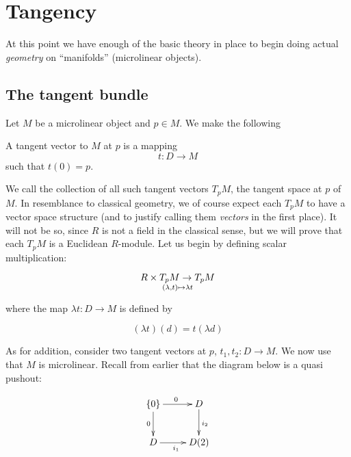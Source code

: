 \chapter{Tangency} \label{sec:tangency}

At this point we have enough of the basic theory in place to begin doing actual \emph{geometry} on ``manifolds'' (microlinear objects).

\section{The tangent bundle}

Let \( M \) be a microlinear object and \( p\in M \). We make the following

\begin{defn}
  A tangent vector to \( M \) at \( p \) is a mapping 
  \begin{equation*}
    t:D\to M
  \end{equation*}
  such that \( t(0)=p \).
\end{defn}

We call the collection of all such tangent vectors \( T_pM \), the tangent space at \( p \) of \( M \). In resemblance to classical geometry, we of course expect each \( T_pM \) to have a vector space structure (and to justify calling them \emph{vectors} in the first place). It will not be so, since \( R \) is not a field in the classical sense, but we will prove that each \( T_pM \) is a Euclidean \( R \)-module. Let us begin by defining scalar multiplication:

\begin{equation*}
  R\times T_pM \to T_pM \atop (\lambda,t)\mapsto \lambda t
\end{equation*}

where the map \( \lambda t: D\to M \) is defined by

\begin{equation*}
  (\lambda t)(d) = t(\lambda d)
\end{equation*}

As for addition, consider two tangent vectors at \( p \), \( t_1,t_2:D\to M \). We now use that \( M \) is microlinear. Recall from earlier that the diagram below is a quasi pushout:

\begin{equation}
  \xymatrix{
    {\{0\}} \ar[d]_0 \ar[r]^0   & D \ar[d]^{i_2} \\
    D \ar[r]_{i_1}              & D(2)
  }
  \label{dg:pushoutcopy}
\end{equation}

